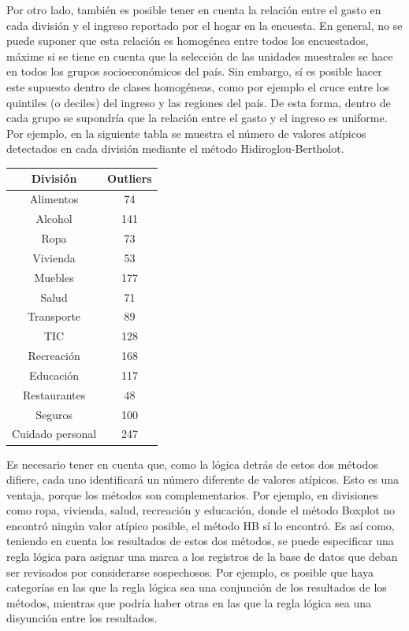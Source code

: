 \documentclass[
  10pt,
  spanish,
]{book}
\begin{document}
Por otro lado, también es posible tener en cuenta la relación entre el gasto en cada división y el ingreso reportado por el hogar en la encuesta. En general, no se puede suponer que esta relación es homogénea entre todos los encuestados, máxime si se tiene en cuenta que la selección de las unidades muestrales se hace en todos los grupos socioeconómicos del país. Sin embargo, sí es posible hacer este supuesto dentro de clases homogéneas, como por ejemplo el cruce entre los quintiles (o deciles) del ingreso y las regiones del país. De esta forma, dentro de cada grupo se supondría que la relación entre el gasto y el ingreso es uniforme. Por ejemplo, en la siguiente tabla se muestra el número de valores atípicos detectados en cada división mediante el método Hidiroglou-Bertholot.

\begin{longtable}[]{@{}cc@{}}
\toprule
División & Outliers \\
\midrule
\endhead
Alimentos & 74 \\
Alcohol & 141 \\
Ropa & 73 \\
Vivienda & 53 \\
Muebles & 177 \\
Salud & 71 \\
Transporte & 89 \\
TIC & 128 \\
Recreación & 168 \\
Educación & 117 \\
Restaurantes & 48 \\
Seguros & 100 \\
Cuidado personal & 247 \\
\bottomrule
\end{longtable}

Es necesario tener en cuenta que, como la lógica detrás de estos dos métodos difiere, cada uno identificará un número diferente de valores atípicos. Esto es una ventaja, porque los métodos son complementarios. Por ejemplo, en divisiones como ropa, vivienda, salud, recreación y educación, donde el método Boxplot no encontró ningún valor atípico posible, el método HB sí lo encontró. Es así como, teniendo en cuenta los resultados de estos dos métodos, se puede especificar una regla lógica para asignar una marca a los registros de la base de datos que deban ser revisados por considerarse sospechosos. Por ejemplo, es posible que haya categorías en las que la regla lógica sea una conjunción de los resultados de los métodos, mientras que podría haber otras en las que la regla lógica sea una disyunción entre los resultados.
\end{document}
